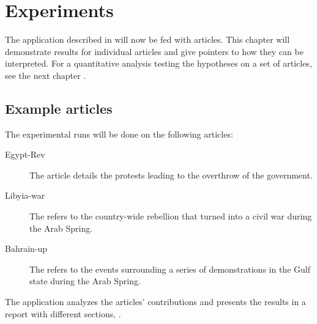 \chapter{Experiments}\label{ch:experiment}

The application described in  will now be fed with articles. 
This chapter will demonstrate results for individual articles and give pointers to how they can be interpreted.
For a quantitative analysis testing the hypotheses on a set of articles, see the next chapter .
\vspace{2em}

\section{Example articles}

The experimental runs will be done on the following articles:

\begin{description}
  \item[Egypt-Rev] The article  details the protests leading to the overthrow of the government.
  \item[Libyia-war] The  refers to the country-wide rebellion that turned into a civil war during the Arab Spring.
  \item[Bahrain-up] The  refers to the events surrounding a series of demonstrations in the Gulf state during the Arab Spring.
\end{description}

The application analyzes the articles' contributions and presents the results in a report with different sections, .

